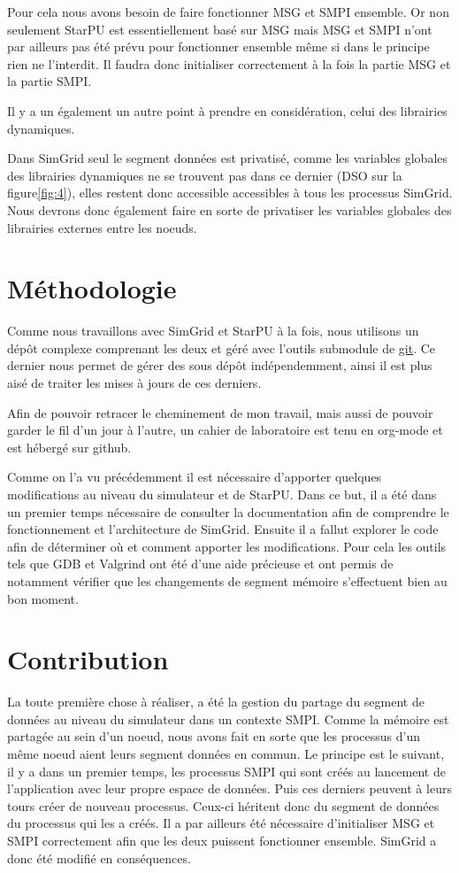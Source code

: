 \documentclass[smallextended]{svjour3}
\begin{document}
Pour cela nous avons besoin de faire fonctionner MSG et SMPI
ensemble. Or non seulement StarPU est essentiellement basé sur MSG
mais MSG et SMPI n'ont par ailleurs pas été prévu pour fonctionner
ensemble même si dans le principe rien ne l'interdit. Il
faudra donc initialiser correctement à la fois la partie MSG et la
partie SMPI.  

Il y a un également un autre point à prendre en considération,
celui des librairies dynamiques. 

Dans SimGrid seul le segment données est privatisé, comme les
variables globales des librairies dynamiques ne se trouvent pas
dans ce dernier (DSO sur la figure\ref{fig:4}), elles restent donc
accessible accessibles à tous les processus SimGrid. Nous devrons donc
également faire en sorte de privatiser les variables globales des
librairies externes entre les noeuds. 

\section{Méthodologie}
\label{sec-4}
Comme nous travaillons avec SimGrid et StarPU à la fois, nous
utilisons un dépôt complexe comprenant les deux et géré avec
l'outils submodule de \href{https://github.com/swhatelse/Journal}{git}. Ce dernier nous permet de gérer des sous
dépôt indépendemment, ainsi il est plus aisé de traiter les mises à
jours de ces derniers.

Afin de pouvoir retracer le cheminement de mon travail, mais aussi
de pouvoir garder le fil d'un jour à l'autre, un cahier de
laboratoire est tenu en org-mode et est hébergé sur github.

Comme on l'a vu précédemment il est nécessaire d'apporter quelques
modifications au niveau du simulateur et de StarPU. Dans ce but, il
a été dans un premier temps nécessaire de consulter la documentation
afin de comprendre le fonctionnement et l'architecture de
SimGrid. Ensuite il a fallut explorer le code afin de déterminer où
et comment apporter les modifications. Pour cela les outils tels que
GDB et Valgrind ont été d'une aide précieuse et ont permis de notamment
vérifier que les changements de segment mémoire s'effectuent bien au
bon moment.

\section{Contribution}
\label{sec-5}
La toute première chose à réaliser, a été la gestion du partage du
segment de données au niveau du simulateur dans un contexte
SMPI. Comme la mémoire est partagée au sein d'un noeud, nous avons
fait en sorte que les processus d'un même noeud aient leurs segment
données en commun. Le principe est le suivant, il y a dans un
premier temps, les processus SMPI qui sont créés au lancement de
l'application avec leur propre espace de données. Puis ces derniers
peuvent à leurs tours créer de nouveau processus. Ceux-ci héritent
donc du segment de données du processus qui les a créés. Il a par
ailleurs été nécessaire d'initialiser MSG et SMPI
correctement afin que les deux puissent fonctionner
ensemble. SimGrid a donc été modifié en conséquences. 
\end{document}
